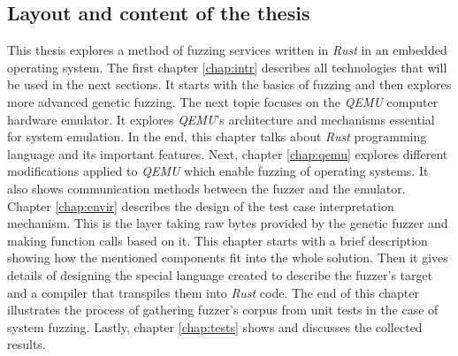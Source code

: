 \subsection{Layout and content of the thesis}
This thesis explores a method of fuzzing services written in \textit{Rust} in an embedded operating system. The first chapter \ref{chap:intr} describes all technologies that will be used in the next sections. It starts with the basics of fuzzing and then explores more advanced genetic fuzzing. The next topic focuses on the \textit{QEMU} computer hardware emulator. It explores \textit{QEMU}'s architecture and mechanisms essential for system emulation. In the end, this chapter talks about \textit{Rust} programming language and its important features. Next, chapter \ref{chap:qemu} explores different modifications applied to \textit{QEMU} which enable fuzzing of operating systems. It also shows communication methods between the fuzzer and the emulator. Chapter \ref{chap:envir} describes the design of the test case interpretation mechanism. This is the layer taking raw bytes provided by the genetic fuzzer and making function calls based on it. This chapter starts with a brief description showing how the mentioned components fit into the whole solution. Then it gives details of designing the special language created to describe the fuzzer's target and a compiler that transpiles them into \textit{Rust} code. The end of this chapter illustrates the process of gathering fuzzer's corpus from unit tests in the case of system fuzzing. Lastly, chapter \ref{chap:tests} shows and discusses the collected results.
